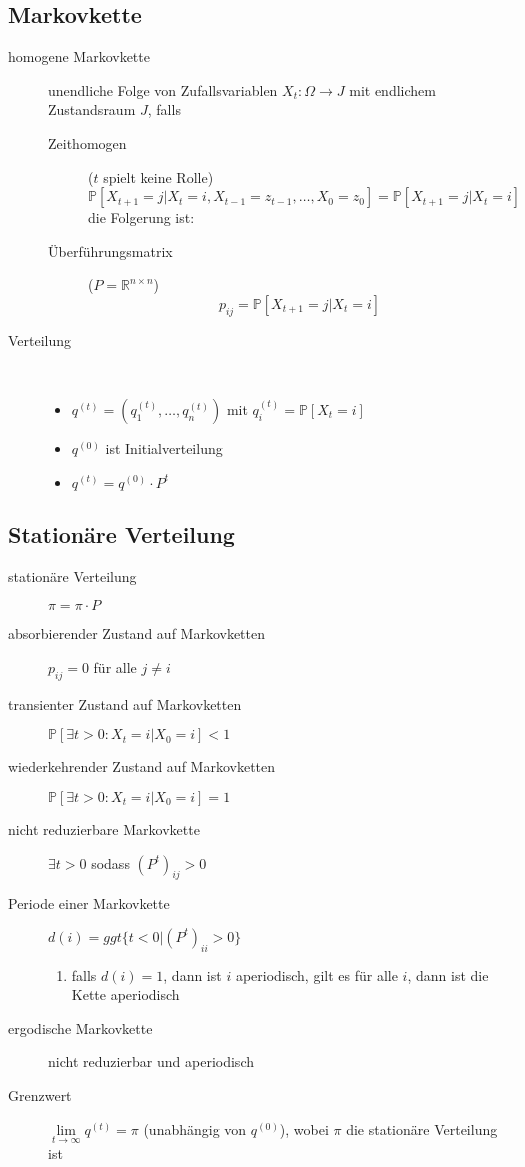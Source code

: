 \subsection{Markovkette}
	\begin{description}
		\item[homogene Markovkette] unendliche Folge von Zufallsvariablen $X_t:\Omega\rightarrow J$ mit endlichem Zustandsraum $J$, falls
			\begin{description}
				\item[Zeithomogen] ($t$ spielt keine Rolle)
					\[\mathbb{P}[X_{t+1}=j|X_t=i,X_{t-1}=z_{t-1},\dots,X_0=z_0]=\mathbb{P}[X_{t+1}=j|X_t=i]\]
					die Folgerung ist:
				\item[Überführungsmatrix] ($P=\mathbb{R}^{n\times n}$)
					\[p_{ij}=\mathbb{P}[X_{t+1}=j|X_t=i]\]
			\end{description}
		\item[Verteilung] \ \\\vspace*{-\baselineskip}
			\begin{itemize}
				\item $q^{(t)}=(q_1^{(t)},\dots,q_n^{(t)})$ mit $q_i^{(t)}=\mathbb{P}[X_t=i]$
				\item $q^{(0)}$ ist Initialverteilung
				\item $q^{(t)}=q^{(0)}\cdot P^t$
			\end{itemize}
	\end{description}
\subsection{Stationäre Verteilung}
	\begin{description}
		\item[stationäre Verteilung] $\pi=\pi\cdot P$
		\item[absorbierender Zustand auf Markovketten] $p_{ij}=0$ für alle $j\neq i$
		\item[transienter Zustand auf Markovketten] $\mathbb{P}[\exists t>0 : X_t=i|X_0=i]<1$
		\item[wiederkehrender Zustand auf Markovketten] $\mathbb{P}[\exists t>0 : X_t=i|X_0=i]=1$
	\end{description}
\topbreak
\vspace*{-2\baselineskip}
	\begin{description}
		\item[nicht reduzierbare Markovkette] $\exists t>0$ sodass $(P^t)_{ij}>0$
		\item[Periode einer Markovkette] $d(i)=ggt\{t<0|(P^t)_{ii}>0\}$
			\begin{enumerate}
				\item falls $d(i)=1$, dann ist $i$ aperiodisch, gilt es für alle $i$, dann ist die Kette aperiodisch
			\end{enumerate}
		\item[ergodische Markovkette] nicht reduzierbar und aperiodisch
		\item[Grenzwert] $\lim\limits_{t\rightarrow\infty} q^{(t)}=\pi$ (unabhängig von $q^{(0)}$), wobei $\pi$ die stationäre Verteilung ist
	\end{description}